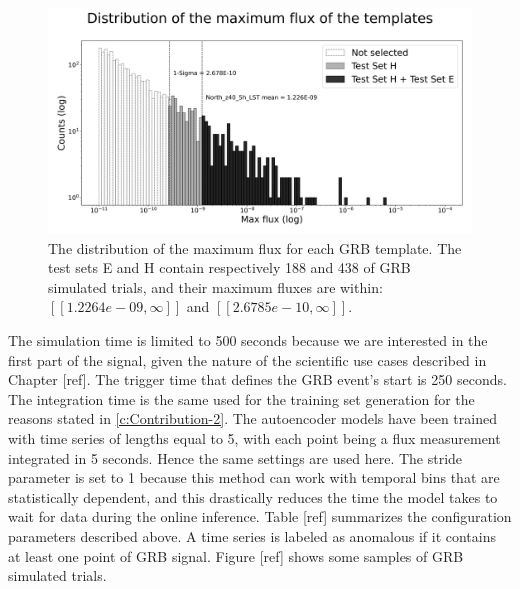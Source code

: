 
\begin{figure}[t]
\centering
\includegraphics[width=1\textwidth]{figures/experiments/templates_max_flux_distributions.png}
\caption{The distribution of the maximum flux for each GRB template. The test sets E and H contain respectively 188  and 438 of GRB simulated trials, and their maximum fluxes are within: $[[1.2264e-09, \infty]]$ and $[[2.6785e-10, \infty]]$.}
\label{f:exp-max-flux-distribution-E}
\end{figure}


The simulation time is limited to 500 seconds because we are interested in the first part of the signal, given the nature of the scientific use cases described in Chapter [ref]. The trigger time that defines the GRB event's start is 250 seconds. The integration time is the same used for the training set generation for the reasons stated in \autoref{c:Contribution-2}. The autoencoder models have been trained with time series of lengths equal to 5, with each point being a flux measurement integrated in 5 seconds. Hence the same settings are used here. The stride parameter is set to 1 because this method can work with temporal bins that are statistically dependent, and this drastically reduces the time the model takes to wait for data during the online inference. Table [ref] summarizes the configuration parameters described above. A time series is labeled as anomalous if it contains at least one point of GRB signal. Figure [ref] shows some samples of GRB simulated trials.  

